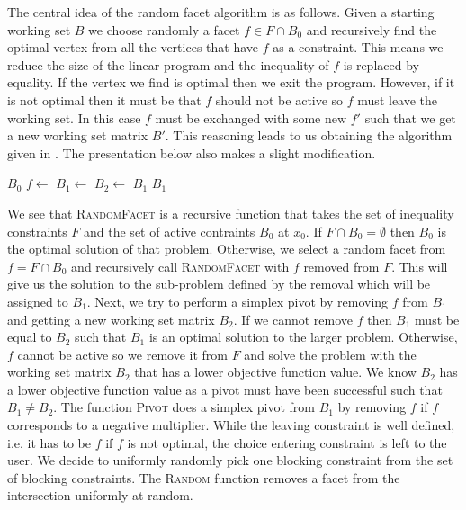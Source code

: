 \documentclass{standalone}
\begin{document}
{  The central idea of the random facet algorithm is as follows. Given a starting working set $B$ we choose randomly a facet $f\in F\cap B_{0}$ and recursively find the optimal vertex from all the vertices that have $f$ as a constraint. This means we reduce the size of the linear program and the inequality of $f$ is replaced by equality. If the vertex we find is optimal then we exit the program. However, if it is not optimal then it must be that $f$ should not be active so $f$ must leave the working set. In this case $f$ must be exchanged with some new $f'$ such that we get a new working set matrix $B'$. This reasoning leads to us obtaining the algorithm given in \cite{hansen2015improved}. The presentation below also makes a slight modification.
  \begin{center}
    \begin{algorithmic}
          \Return $B_{0}$
        \Else
          \State $f\gets $
          \State $B_{1}\gets $
          \State $B_{2}\gets $
            \Return $B_{1}$
            \Return {}
          \Else
            \:\Return $B_{1}$
          \EndIf
        \EndIf
      \EndFunction
    \end{algorithmic}
  \end{center}
  We see that \textsc{RandomFacet} is a recursive function that takes the set of inequality constraints $F$ and the set of active contraints $B_{0}$ at $x_{0}$. If $F\cap B_{0}=\emptyset$ then $B_{0}$ is the optimal solution of that problem. Otherwise, we select a random facet from $f=F\cap B_{0}$ and recursively call \textsc{RandomFacet} with $f$ removed from $F$. This will give us the solution to the sub-problem defined by the removal which will be assigned to $B_{1}$. Next, we try to perform a simplex pivot by removing $f$ from $B_{1}$ and getting a new working set matrix $B_{2}$. If we cannot remove $f$ then $B_{1}$ must be equal to $B_{2}$ such that $B_{1}$ is an optimal solution to the larger problem. Otherwise, $f$ cannot be active so we remove it from $F$ and solve the problem with the working set matrix $B_{2}$ that has a lower objective function value. We know $B_{2}$ has a lower objective function value as a pivot must have been successful such that $B_{1}\ne B_{2}$. The function \textsc{Pivot} does a simplex pivot from $B_{1}$ by removing $f$ if $f$ corresponds to a negative multiplier. While the leaving constraint is well defined, i.e. it has to be $f$ if $f$ is not optimal, the choice entering constraint is left to the user. We decide to uniformly randomly pick one blocking constraint from the set of blocking constraints. The \textsc{Random} function removes a facet from the intersection uniformly at random.\par
}
\end{document}
